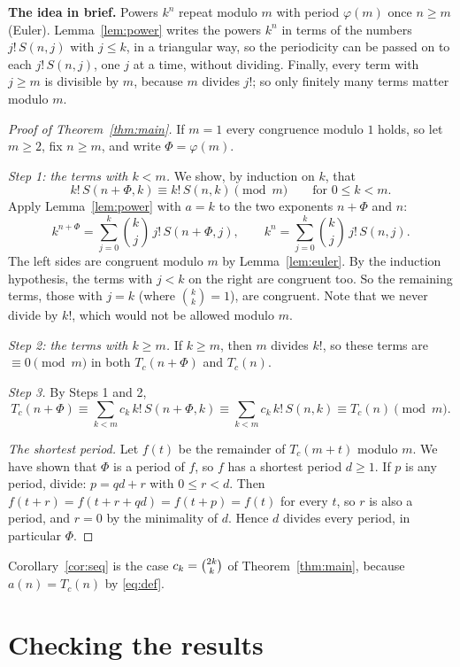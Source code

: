 \documentclass[11pt,a4paper]{article}
\theoremstyle{definition}
\theoremstyle{remark}
\newcommand{\para}[1]{\par\medskip\noindent\textbf{#1}\enspace}
\begin{document}
\para{The idea in brief.} Powers $k^n$ repeat modulo $m$ with period $\varphi(m)$ once $n\ge m$ (Euler).
Lemma~\ref{lem:power} writes the powers $k^n$ in terms of the numbers $j!\,S(n,j)$ with $j\le k$, in a triangular way, so
the periodicity can be passed on to each $j!\,S(n,j)$, one $j$ at a time, without dividing. Finally, every term with
$j\ge m$ is divisible by $m$, because $m$ divides $j!$; so only finitely many terms matter modulo $m$.

\begin{proof}[Proof of Theorem~\ref{thm:main}]
If $m=1$ every congruence modulo $1$ holds, so let $m\ge2$, fix $n\ge m$, and write $\Phi=\varphi(m)$.

\emph{Step 1: the terms with $k<m$.} We show, by induction on $k$, that
\[
k!\,S(n+\Phi,k)\equiv k!\,S(n,k)\pmod m\qquad\text{for }0\le k<m.
\]
Apply Lemma~\ref{lem:power} with $a=k$ to the two exponents $n+\Phi$ and $n$:
\[
k^{n+\Phi}=\sum_{j=0}^{k}\binom kj\,j!\,S(n+\Phi,j),\qquad
k^{n}=\sum_{j=0}^{k}\binom kj\,j!\,S(n,j).
\]
The left sides are congruent modulo $m$ by Lemma~\ref{lem:euler}. By the induction hypothesis, the terms with $j<k$ on the
right are congruent too. So the remaining terms, those with $j=k$ (where $\binom kk=1$), are congruent. Note that we never
divide by $k!$, which would not be allowed modulo $m$.

\emph{Step 2: the terms with $k\ge m$.} If $k\ge m$, then $m$ divides $k!$, so these terms are $\equiv0\pmod m$ in both
$T_c(n+\Phi)$ and $T_c(n)$.

\emph{Step 3.} By Steps 1 and 2,
\[
T_c(n+\Phi)\equiv\sum_{k<m}c_k\,k!\,S(n+\Phi,k)\equiv\sum_{k<m}c_k\,k!\,S(n,k)\equiv T_c(n)\pmod m .
\]

\emph{The shortest period.} Let $f(t)$ be the remainder of $T_c(m+t)$ modulo $m$. We have shown that $\Phi$ is a period of
$f$, so $f$ has a shortest period $d\ge1$. If $p$ is any period, divide: $p=qd+r$ with $0\le r<d$. Then
$f(t+r)=f(t+r+qd)=f(t+p)=f(t)$ for every $t$, so $r$ is also a period, and $r=0$ by the minimality of $d$. Hence $d$
divides every period, in particular $\Phi$.
\end{proof}

Corollary~\ref{cor:seq} is the case $c_k=\tbinom{2k}{k}$ of Theorem~\ref{thm:main}, because $a(n)=T_c(n)$ by \eqref{eq:def}.

\section{Checking the results}\label{sec:checks}
\end{document}
